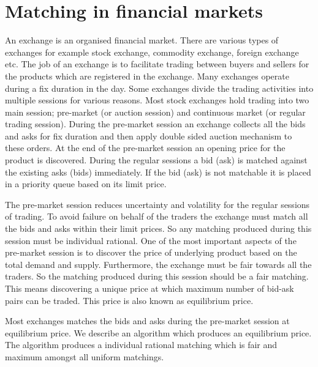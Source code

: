 \documentclass[a4paper,UKenglish,cleveref, autoref]{lipics-v2019}
\begin{document}
\begin{theorem}
\end{theorem}


\section{Matching in financial markets}\label{sec:matchingInMarkets} 
An exchange is an organised financial market. There are various types of exchanges for example stock exchange, commodity exchange, foreign exchange etc. The job of an exchange is to facilitate trading between buyers and sellers for the products which are registered in the exchange. Many exchanges operate during a fix duration in the day. Some exchanges divide the trading activities into multiple sessions for various reasons. Most stock exchanges hold trading into two main session; pre-market (or auction session) and continuous  market (or regular trading session). During the pre-market session an exchange collects all the bids and asks for fix duration and then apply double sided auction mechanism to these orders. At the end of the pre-market session an opening price for the product is discovered. During the regular sessions a bid (ask) is matched against the existing asks (bids) immediately. If the bid (ask) is not matchable it is placed in a priority queue based on its limit price. 

The pre-market session reduces uncertainty and volatility for the regular sessions of trading. To avoid failure on behalf of the traders the exchange must match all the bids and asks within their limit prices. So any matching produced during this session must be individual rational. One of the most important aspects of the pre-market session is to discover the price of underlying product based on the total demand and supply. Furthermore, the exchange must be fair towards all the traders. So the matching produced during this session should be a fair matching.  This means discovering  a unique price at which maximum number of  bid-ask pairs can be traded. This price is also known as equilibrium price. 

Most exchanges matches the bids and asks during the pre-market session at equilibrium price.   We describe an algorithm which produces an equilibrium price. The algorithm  produces a individual rational matching which is fair and maximum amongst all uniform matchings.
\end{document}
